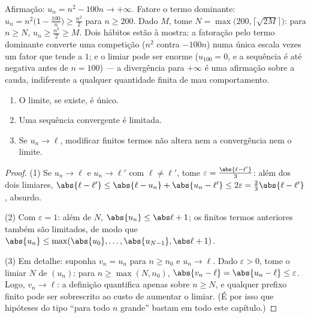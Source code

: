 \begin{example}\label{ex:b1:seq:toinfinity}
Afirmação: $u_n = n^2 - 100n \to +\infty$. Fatore o termo dominante:
$u_n = n^2\bigl(1 - \frac{100}{n}\bigr) \geq \frac{n^2}{2}$ para
$n \geq 200$. Dado $M$, tome $N = \max\bigl(200,
\lceil\sqrt{2M}\rceil\bigr)$: para $n \geq N$, $u_n \geq
\frac{n^2}{2} \geq M$. Dois hábitos estão à mostra: a
fatoração pelo termo dominante converte uma competição ($n^2$ contra
$-100n$) numa única escala vezes um fator que tende a $1$; e o limiar
pode ser enorme ($u_{100} = 0$, e a sequência é até negativa antes de
$n = 100$) --- a divergência para $+\infty$ é uma afirmação sobre a
cauda, indiferente a qualquer quantidade finita de mau comportamento.
\end{example}

\begin{proposition}\label{prop:b1:seq:first}
\begin{enumerate}
  \item O limite, se existe, é único.
  \item Uma sequência convergente é limitada.
  \item Se $u_n \to \ell$, modificar finitos termos não altera nem a
        convergência nem o limite.
\end{enumerate}
\end{proposition}

\begin{proof}
(1) Se $u_n \to \ell$ e $u_n \to \ell'$ com $\ell \neq \ell'$,
tome $\varepsilon = \frac{\abs{\ell - \ell'}}{3}$: além dos dois
limiares, $\abs{\ell - \ell'} \leq \abs{\ell - u_n} + \abs{u_n -
\ell'} \leq 2\varepsilon = \frac23 \abs{\ell - \ell'}$, absurdo.

(2) Com $\varepsilon = 1$: além de $N$, $\abs{u_n} \leq \abs\ell +
1$; os finitos termos anteriores também são limitados, de modo que $\abs{u_n}
\leq \max(\abs{u_0}, \dots, \abs{u_{N-1}}, \abs\ell + 1)$.

(3) Em detalhe: suponha $v_n = u_n$ para $n \geq n_0$ e $u_n \to
\ell$. Dado $\varepsilon > 0$, tome o limiar $N$ de
$(u_n)$: para $n \geq \max(N, n_0)$, $\abs{v_n - \ell} = \abs{u_n
- \ell} \leq \varepsilon$. Logo, $v_n \to \ell$: a definição
quantifica apenas sobre $n \geq N$, e qualquer prefixo finito pode ser
sobrescrito ao custo de aumentar o limiar. (É por isso que hipóteses do
tipo ``para todo $n$ grande'' bastam em todo este capítulo.)
\end{proof}

